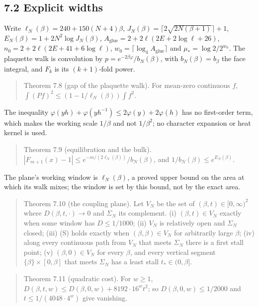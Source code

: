 \documentclass[10pt,letterpaper,twocolumn]{article}
\begin{document}
\subsection{7.2 Explicit widths}\label{72-explicit-widths}

Write \(\ell_N(\beta)=240+150(N+4)\beta\), \(J_N(\beta)=\lceil2\sqrt{2N(\beta+1)}\rceil+1\), \(E_N(\beta)=1+2N^2\log J_N(\beta)\), \(A_{\mathrm{glue}}=2+2\ell(2E+2\log\ell+26)\), \(n_0=2+2\ell(2E+41+6\log\ell)\), \(w_0=\lceil\log_4A_{\mathrm{glue}}\rceil\) and \(\mu_\ast=\log2/2^{w_0}\). The plaquette walk is convolution by \(p=e^{-2\beta\varphi}/b_N(\beta)\), with \(b_N(\beta)=b_\beta\) the face integral, and \(F_k\) is its \((k+1)\)-fold power.

\begin{quote}
Theorem 7.8 (gap of the plaquette walk). For mean-zero continuous \(f\), \(\int(Pf)^2\le(1-1/\ell_N(\beta))\int f^2\).
\end{quote}

The inequality \(\varphi(yh)+\varphi(yh^{-1})\le2\varphi(y)+2\varphi(h)\) has no first-order term, which makes the working scale \(1/\beta\) and not \(1/\beta^2\); no character expansion or heat kernel is used.

\begin{quote}
Theorem 7.9 (equilibration and the bulk). \(|F_{m+1}(x)-1|\le e^{-m/(2\ell_N(\beta))}/b_N(\beta)\), and \(1/b_N(\beta)\le e^{E_N(\beta)}\).
\end{quote}

The plane's working window is \(\ell_N(\beta)\), a proved upper bound on the area at which its walk mixes; the window is set by this bound, not by the exact area.

\begin{quote}
Theorem 7.10 (the coupling plane). Let \(V_N\) be the set of \((\beta,t)\in[0,\infty)^2\) where \(D(\beta,t,\cdot)\to0\) and \(\Sigma_N\) its complement. (i) \((\beta,t)\in V_N\) exactly when some window has \(D\le1/1000\); (ii) \(V_N\) is relatively open and \(\Sigma_N\) closed; (iii) (S) holds exactly when \((\beta,\beta)\in V_N\) for arbitrarily large \(\beta\); (iv) along every continuous path from \(V_N\) that meets \(\Sigma_N\) there is a first stall point; (v) \((\beta,0)\in V_N\) for every \(\beta\), and every vertical segment \(\{\beta\}\times[0,\beta]\) that meets \(\Sigma_N\) has a least stall \(t_\ast\in(0,\beta]\).
\end{quote}

\begin{quote}
Theorem 7.11 (quadratic cost). For \(w\ge1\), \(D(\beta,t,w)\le D(\beta,0,w)+8192\cdot16^wt^2\); so \(D(\beta,0,w)\le1/2000\) and \(t\le1/(4048\cdot4^w)\) give vanishing.
\end{quote}
\end{document}
